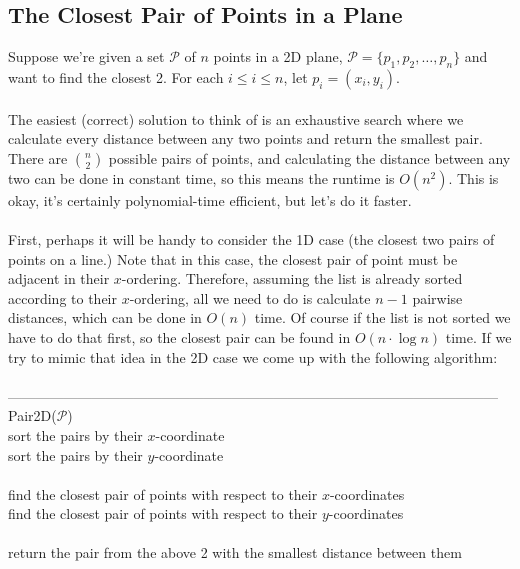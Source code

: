 \documentclass{article}
\newcommand{\x}{\cdot}
\begin{document}
\subsection{The Closest Pair of Points in a Plane}
Suppose we're given a set $\mathcal{P}$ of $n$ points in a 2D plane, $\mathcal{P} = \{p_1, p_2, \dots, p_n\}$ and want to find the closest 2. For each $i \leq i \leq n$, let $p_i = (x_i, y_i)$.\\\\
The easiest (correct) solution to think of is an exhaustive search where we calculate every distance between any two points and return the smallest pair. There are $n \choose 2$ possible pairs of points, and calculating the distance between any two can be done in constant time, so this means the runtime is $O(n^2)$. This is okay, it's certainly polynomial-time efficient, but let's do it faster.\\\\
First, perhaps it will be handy to consider the 1D case (the closest two pairs of points on a line.) Note that in this case, the closest pair of point must be adjacent in their $x$-ordering. Therefore, assuming the list is already sorted according to their $x$-ordering, all we need to do is calculate $n-1$ pairwise distances, which can be done in $O(n)$ time. Of course if the list is not sorted we have to do that first, so the closest pair can be found in $O(n\x \log n)$ time. If we try to mimic that idea in the 2D case we come up with the following algorithm:\\\\
---------------------------------------------------------------------------------------------------------
Pair2D($\mathcal{P}$)\\
	\hspace*{7mm} sort the pairs by their $x$-coordinate\\
	\hspace*{7mm} sort the pairs by their $y$-coordinate\\\\
	\hspace*{7mm} find the closest pair of points with respect to their $x$-coordinates\\
	\hspace*{7mm} find the closest pair of points with respect to their $y$-coordinates\\\\
	\hspace*{7mm} return the pair from the above 2 with the smallest distance between them\\
\end{document}

